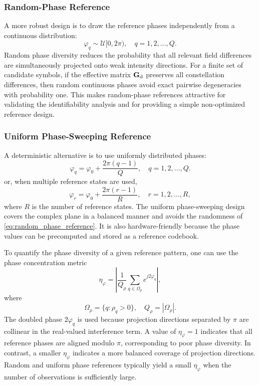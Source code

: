 \documentclass[journal]{IEEEtran}
\begin{document}
\subsubsection{Random-Phase Reference}

A more robust design is to draw the reference phases independently from a continuous distribution:
\begin{equation}
\varphi_q
\sim
\mathcal{U}[0,2\pi),
\quad
q=1,2,\ldots,Q.
\label{eq:random_phase_reference}
\end{equation}
Random phase diversity reduces the probability that all relevant field differences are simultaneously projected onto weak intensity directions. 
For a finite set of candidate symbols, if the effective matrix $\mathbf{G}_{\rm d}$ preserves all constellation differences, then random continuous phases avoid exact pairwise degeneracies with probability one. 
This makes random-phase references attractive for validating the identifiability analysis and for providing a simple non-optimized reference design.

\subsubsection{Uniform Phase-Sweeping Reference}

A deterministic alternative is to use uniformly distributed phases:
\begin{equation}
\varphi_q
=
\varphi_0
+
\frac{2\pi(q-1)}{Q},
\quad
q=1,2,\ldots,Q.
\label{eq:uniform_phase_reference}
\end{equation}
or, when multiple reference states are used,
\begin{equation}
\varphi_{r}
=
\varphi_0
+
\frac{2\pi(r-1)}{R},
\quad
r=1,2,\ldots,R,
\label{eq:uniform_phase_states}
\end{equation}
where $R$ is the number of reference states. 
The uniform phase-sweeping design covers the complex plane in a balanced manner and avoids the randomness of \eqref{eq:random_phase_reference}. 
It is also hardware-friendly because the phase values can be precomputed and stored as a reference codebook.

To quantify the phase diversity of a given reference pattern, one can use the phase concentration metric
\begin{equation}
\eta_{\varphi}
=
\left|
\frac{1}{Q_{\rho}}
\sum_{q\in\Omega_{\rho}}
e^{j2\varphi_q}
\right|,
\label{eq:phase_concentration_metric}
\end{equation}
where
\begin{equation}
\Omega_{\rho}=\{q:\rho_q>0\},
\quad
Q_{\rho}=|\Omega_{\rho}|.
\end{equation}
The doubled phase $2\varphi_q$ is used because projection directions separated by $\pi$ are collinear in the real-valued interference term. 
A value of $\eta_{\varphi}=1$ indicates that all reference phases are aligned modulo $\pi$, corresponding to poor phase diversity. 
In contrast, a smaller $\eta_{\varphi}$ indicates a more balanced coverage of projection directions. 
Random and uniform phase references typically yield a small $\eta_{\varphi}$ when the number of observations is sufficiently large.
\end{document}
